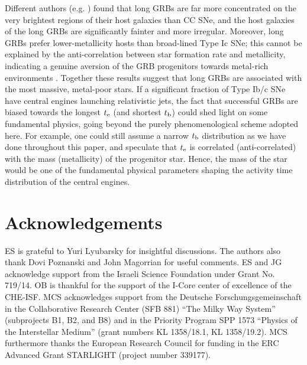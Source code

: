 \documentclass[useAMS,usenatbib]{mn2e}
\begin{document}
Different authors (e.g. \citealt{Fruchter2006,Svensson2010}) found that long GRBs are far more concentrated on the very brightest regions of their host galaxies than CC SNe, and the host galaxies of the long GRBs are significantly fainter and more irregular. Moreover, long GRBs prefer lower-metallicity hosts than broad-lined Type Ic SNe; this cannot be explained by the anti-correlation between star formation rate and metallicity, indicating a genuine aversion of the GRB progenitors towards metal-rich environments \citep{Modjaz2008b, GrahamFruchter2013}. Together these results suggest that long GRBs are associated with the most massive, metal-poor stars. If a significant fraction of Type Ib/c SNe have central engines launching relativistic jets, the fact that successful GRBs are biased towards the longest $t_{\rm e}$ (and shortest $t_{\rm b}$) could shed light on some fundamental physics, going beyond the purely phenomenological scheme adopted here. For example, one could still assume a narrow $t_{\rm b}$ distribution as we have done throughout this paper, and speculate that $t_{\rm e}$ is correlated (anti-correlated) with the mass (metallicity) of the progenitor star. Hence, the mass of the star would be one of the fundamental physical parameters shaping the activity time distribution of the central engines.


\section*{Acknowledgements}
ES is grateful to Yuri Lyubarsky for insightful discussions. The authors also thank Dovi Poznanski and John Magorrian for useful comments. ES and JG acknowledge support from the Israeli Science Foundation under Grant No. 719/14. OB is thankful for the support of the I-Core center of excellence of the CHE-ISF. MCS acknowledges support from the Deutsche Forschungsgemeinschaft in the Collaborative Research Center (SFB 881) ``The Milky Way System'' (subprojects B1, B2, and B8) and in the Priority Program SPP 1573 ``Physics of the Interstellar Medium'' (grant numbers KL 1358/18.1, KL 1358/19.2). MCS furthermore thanks the European Research Council for funding in the ERC Advanced Grant STARLIGHT (project number 339177).

\def\aap{A\&A}\def\aj{AJ}\def\apj{ApJ}\def\apjl{ApJ}\def\mnras{MNRAS}
\def\araa{ARA\&A}\def\physrep{PhR}\def\sovast{Sov. Astron.}\def\pasp{PASP}
\def\aapr{Astronomy \& Astrophysics Review}\def\apjs{ApJS}\def\nat{Nature}


\end{document}
